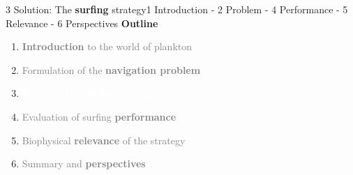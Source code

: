 
\begin{frame}{3 Solution: The \textbf{surfing} strategy}{1 Introduction - 2 Problem - 4 Performance - 5 Relevance - 6 Perspectives}
	\centering
	\vspace{15pt}
	\textbf{\Large Outline}

	\vspace{15pt}

	\large
	\begin{enumerate}
		\setlength\itemsep{10pt}
		\item \textcolor{gray}{\textbf{Introduction} to the world of plankton}
		\item \textcolor{gray}{Formulation of the \textbf{navigation problem}}
		\item \textcolor{white}{Solution: The \textbf{surfing} strategy}
		\item \textcolor{gray}{Evaluation of surfing \textbf{performance}}
		\item \textcolor{gray}{Biophysical \textbf{relevance} of the strategy}
		\item \textcolor{gray}{Summary and \textbf{perspectives}}
	\end{enumerate}

\end{frame}


